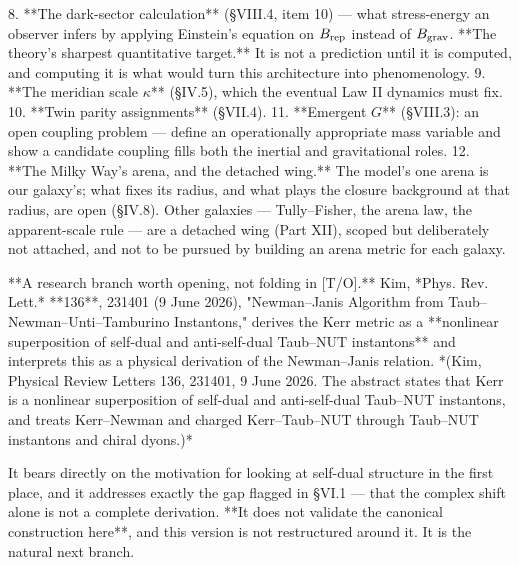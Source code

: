 8. **The dark-sector calculation** (§VIII.4, item 10) — what stress-energy an observer infers by applying Einstein's equation on $B_{\rm rep}$ instead of $B_{\rm grav}$. **The theory's sharpest quantitative target.** It is not a prediction until it is computed, and computing it is what would turn this architecture into phenomenology.
9. **The meridian scale $\kappa$** (§IV.5), which the eventual Law II dynamics must fix.
10. **Twin parity assignments** (§VII.4).
11. **Emergent $G$** (§VIII.3): an open coupling problem — define an operationally appropriate mass variable and show a candidate coupling fills both the inertial and gravitational roles.
12. **The Milky Way's arena, and the detached wing.** The model's one arena is our galaxy's; what fixes its radius, and what plays the closure background at that radius, are open (§IV.8). Other galaxies — Tully–Fisher, the arena law, the apparent-scale rule — are a detached wing (Part XII), scoped but deliberately not attached, and not to be pursued by building an arena metric for each galaxy.

**A research branch worth opening, not folding in [T/O].** Kim, *Phys. Rev. Lett.* **136**, 231401 (9 June 2026), "Newman–Janis Algorithm from Taub–Newman–Unti–Tamburino Instantons," derives the Kerr metric as a **nonlinear superposition of self-dual and anti-self-dual Taub–NUT instantons** and interprets this as a physical derivation of the Newman–Janis relation. *(Kim, Physical Review Letters 136, 231401, 9 June 2026. The abstract states that Kerr is a nonlinear superposition of self-dual and anti-self-dual Taub–NUT instantons, and treats Kerr–Newman and charged Kerr–Taub–NUT through Taub–NUT instantons and chiral dyons.)*

It bears directly on the motivation for looking at self-dual structure in the first place, and it addresses exactly the gap flagged in §VI.1 — that the complex shift alone is not a complete derivation. **It does not validate the canonical construction here**, and this version is not restructured around it. It is the natural next branch.


